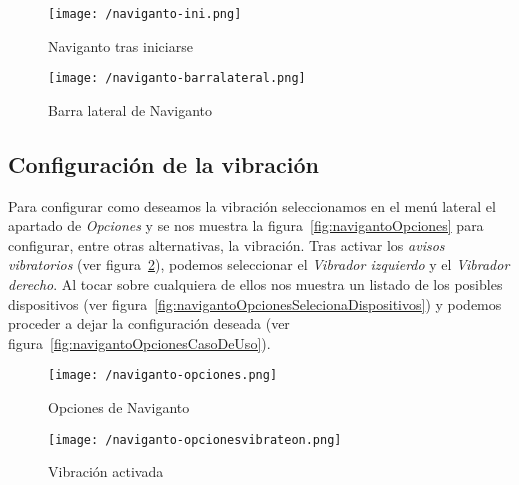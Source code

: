 \begin{figure}[!h]
  \begin{minipage}[b]{0.5\linewidth}
    \begin{center}
      \texttt{[image: /naviganto-ini.png]}
      \caption{Naviganto tras iniciarse}
      \label{fig:navigantoIni}
    \end{center}
  \end{minipage}
  \begin{minipage}[b]{0.5\linewidth}
    \begin{center}
      \texttt{[image: /naviganto-barralateral.png]}
      \caption{Barra lateral de Naviganto}
      \label{fig:navigantoBarra}
    \end{center}
  \end{minipage}
\end{figure}

\subsection{Configuración de la vibración}

Para configurar como deseamos la vibración seleccionamos en el menú lateral el apartado de
\emph{Opciones} y se nos muestra la figura~\ref{fig:navigantoOpciones} para configurar, entre otras
alternativas, la vibración. Tras activar los \emph{avisos vibratorios} (ver
figura~\ref{fig:navignatoOpcionesVibrateOn}), podemos seleccionar el \emph{Vibrador izquierdo} y el
\emph{Vibrador derecho}. Al tocar sobre cualquiera de ellos nos muestra un listado de los posibles
dispositivos (ver figura~\ref{fig:navigantoOpcionesSelecionaDispositivos}) y podemos proceder a
dejar la configuración deseada (ver figura~\ref{fig:navigantoOpcionesCasoDeUso}).

\begin{figure}[!h]
  \begin{minipage}[b]{0.5\linewidth}
    \begin{center}
      \texttt{[image: /naviganto-opciones.png]}
      \caption{Opciones de Naviganto}
      \label{fig:navigantoOpciones}
    \end{center}
  \end{minipage}
  \begin{minipage}[b]{0.5\linewidth}
    \begin{center}
      \texttt{[image: /naviganto-opcionesvibrateon.png]}
      \caption{Vibración activada}
      \label{fig:navignatoOpcionesVibrateOn}
    \end{center}
  \end{minipage}
\end{figure}


